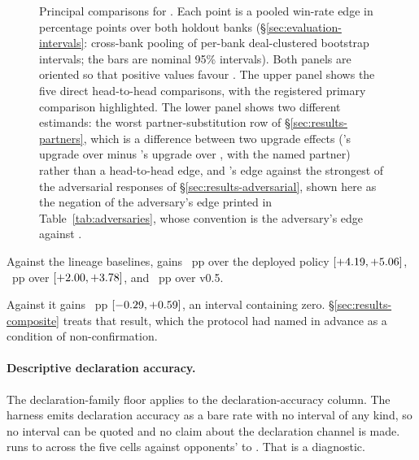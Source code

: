\begin{figure}[!ht]\centering
{\tabfont}
\caption{Principal comparisons for \sestina{}. Each point is a pooled win-rate edge in percentage
points over both holdout banks (\S\ref{sec:evaluation-intervals}: cross-bank pooling of per-bank
deal-clustered bootstrap intervals; the bars are nominal 95\% intervals). Both panels are oriented so that
positive values favour \sestina{}. The upper panel shows the five direct head-to-head comparisons,
with the registered primary comparison highlighted. The lower panel shows two different estimands:
the worst partner-substitution row of \S\ref{sec:results-partners}, which is a difference between
two upgrade effects (\sestina{}'s upgrade over \vsix{} minus \vsix{}'s upgrade over \vfive{}, with
the named partner) rather than a head-to-head edge, and \sestina{}'s edge against the strongest of
the \vsevenBfourArms{} adversarial responses of \S\ref{sec:results-adversarial}, shown here as the
negation of the adversary's edge printed in Table~\ref{tab:adversaries}, whose convention is the
adversary's edge against \sestina{}.}
\label{fig:forest}
\end{figure}

\begin{table}[!ht]\centering
\caption{Strength against the \vsix{} frontier and lineage baselines. Each row is \sestina{}'s
win-rate edge in percentage points against the named configuration, paired duplicate blocks, pooled
over both holdout banks with the per-bank estimates beside it; intervals are nominal 95\%
intervals as constructed in \S\ref{sec:evaluation-intervals}.}
\label{tab:frontier}
{\tabfont}
\end{table}

Against the lineage baselines, \sestina{} gains \vsevenBtwoIncumbent{}~pp over the deployed
\vsix{} policy $[+4.19, +5.06]$, \vsevenBtwoFmid{}~pp over \fmid{}
$[+2.00, +3.78]$, and \vsevenBtwoVfive{}~pp over v0.5.

Against \composite{} it gains \vsevenBtwoComposite{}~pp
$[-0.29, +0.59]$, an interval containing zero.
\S\ref{sec:results-composite} treats that result, which the protocol had named in advance as a
condition of non-confirmation.

\paragraph{Descriptive declaration accuracy.} The declaration-family floor applies to
the declaration-accuracy column. The harness emits declaration accuracy as a bare rate with no
interval of any kind, so no interval can be quoted and no claim about the declaration channel is
made. \sestina{} runs \vsevenDeclFrozenLo{} to \vsevenDeclFrozenHi{} across the five cells against
opponents' \vsevenDeclOppLo{} to \vsevenDeclOppHi{}. That is a diagnostic.


